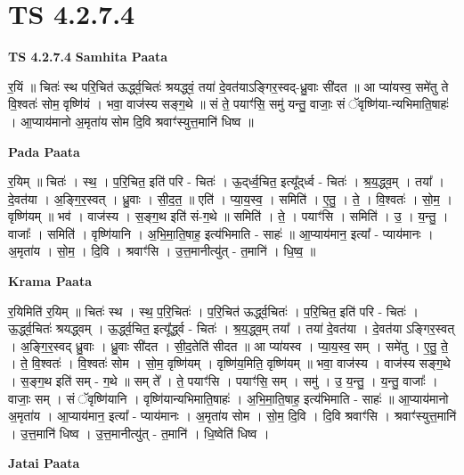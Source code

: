 \documentclass[17pt]{extarticle}
\begin{document}
\section{ TS 4.2.7.4 }

\textbf{TS 4.2.7.4 } \newline
\textbf{Samhita Paata} \newline

र॒यिं ॥ चितः॑ स्थ परि॒चित॑ ऊर्द्ध्व॒चितः॑ श्रयद्ध्वं॒ तया॑ दे॒वत॑याऽङ्गिर॒स्वद्-ध्रु॒वाः सी॑दत ॥ आ प्या॑यस्व॒ समे॑तु ते वि॒श्वतः॑ सोम॒ वृष्णि॑यं । भवा॒ वाज॑स्य सङ्ग॒थे ॥ सं ते॒ पयाꣳ॑सि॒ समु॑ यन्तु॒ वाजाः॒ सं ॅवृष्णि॑या-न्यभिमाति॒षाहः॑ । आ॒प्याय॑मानो अ॒मृता॑य सोम दि॒वि श्रवाꣳ॑स्युत्त॒मानि॑ धिष्व ॥ \newline

\textbf{Pada Paata} \newline

र॒यिम् ॥ चितः॑ । स्थ॒ । प॒रि॒चित॒ इति॑ परि - चितः॑ । ऊ॒द्‌र्ध्व॒चित॒ इत्यू᳚द्‌र्ध्व - चितः॑ । श्र॒य॒द्ध्व॒म् । तया᳚ । दे॒वत॑या । अ॒ङ्गि॒र॒स्वत् । ध्रु॒वाः । सी॒द॒त॒ ॥ एति॑ । प्या॒य॒स्व॒ । समिति॑ । ए॒तु॒ । ते॒ । वि॒श्वतः॑ । सो॒म॒ । वृष्णि॑यम् ॥ भव॑ । वाज॑स्य । स॒ङ्ग॒थ इति॑ सं-ग॒थे ॥ समिति॑ । ते॒ । पयाꣳ॑सि । समिति॑ । उ॒ । य॒न्तु॒ । वाजाः᳚ । समिति॑ । वृष्णि॑यानि । अ॒भि॒मा॒ति॒षाह॒ इत्य॑भिमाति - साहः॑ ॥ आ॒प्याय॑मान॒ इत्या᳚ - प्याय॑मानः । अ॒मृता॑य । सो॒म॒ । दि॒वि । श्रवाꣳ॑सि । उ॒त्त॒मानीत्यु॑त् - त॒मानि॑ । धि॒ष्व॒ ॥  \newline


\textbf{Krama Paata} \newline

र॒यिमिति॑ र॒यिम् ॥ चितः॑ स्थ । स्थ॒ प॒रि॒चितः॑ । प॒रि॒चित॑ ऊर्द्ध्व॒चितः॑ । प॒रि॒चित॒ इति॑ परि - चितः॑ । ऊ॒र्द्ध्व॒चितः॑ श्रयद्ध्वम् । ऊ॒र्द्ध्व॒चित॒ इत्यू᳚र्द्ध्व - चितः॑ । श्र॒य॒द्ध्व॒म् तया᳚ । तया॑ दे॒वत॑या । दे॒वत॑या ऽङ्गिर॒स्वत् । अ॒ङ्गि॒र॒स्वद् ध्रु॒वाः । ध्रु॒वाः सी॑दत । सी॒द॒तेति॑ सीदत ॥ आ प्या॑यस्व । प्या॒य॒स्व॒ सम् । समे॑तु । ए॒तु॒ ते॒ । ते॒ वि॒श्वतः॑ । वि॒श्वतः॑ सोम । सो॒म॒ वृष्णि॑यम् । वृष्णि॑य॒मिति॒ वृष्णि॑यम् ॥ भवा॒ वाज॑स्य । वाज॑स्य सङ्ग॒थे । स॒ङ्ग॒थ इति॑ सम् - ग॒थे ॥ सम् ते᳚ । ते॒ पयाꣳ॑सि । पयाꣳ॑सि॒ सम् । समु॑ । उ॒ य॒न्तु॒ । य॒न्तु॒ वाजाः᳚ । वाजाः॒ सम् । सं ॅवृष्णि॑यानि । वृष्णि॑यान्यभिमाति॒षाहः॑ । अ॒भि॒मा॒ति॒षाह॒ इत्य॑भिमाति - साहः॑ ॥ आ॒प्याय॑मानो अ॒मृता॑य । आ॒प्याय॑मान॒ इत्या᳚ - प्याय॑मानः । अ॒मृता॑य सोम । सो॒म॒ दि॒वि । दि॒वि श्रवाꣳ॑सि । श्रवाꣳ॑स्युत्त॒मानि॑ । उ॒त्त॒मानि॑ धिष्व । उ॒त्त॒मानीत्यु॑त् - त॒मानि॑ । धि॒ष्वेति॑ धिष्व । \newline

\textbf{Jatai Paata} \newline
\end{document}
